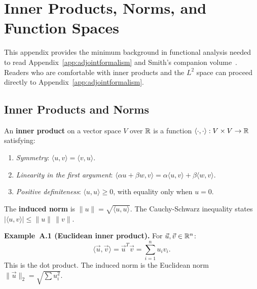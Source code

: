 
\chapter{Inner Products, Norms, and Function Spaces}
\label{app:innerproduct}

This appendix provides the minimum background in functional analysis
needed to read Appendix~\ref{app:adjointformalism} and Smith's companion
volume~\cite{smith2014uncertainty}. Readers who are comfortable with inner products
and the $L^2$ space can proceed directly to Appendix~\ref{app:adjointformalism}.

\section{Inner Products and Norms}
\label{appsec:innerproducts}

An \textbf{inner product} on a vector space $V$ over $\mathbb{R}$ is a function
$\langle \cdot, \cdot \rangle : V \times V \to \mathbb{R}$ satisfying:
\begin{enumerate}[nosep]
  \item \textit{Symmetry}: $\langle u, v \rangle = \langle v, u \rangle$.
  \item \textit{Linearity in the first argument}:
        $\langle \alpha u + \beta w, v \rangle
        = \alpha\langle u, v\rangle + \beta\langle w, v\rangle$.
  \item \textit{Positive definiteness}: $\langle u, u \rangle \geq 0$,
        with equality only when $u = 0$.
\end{enumerate}

The \textbf{induced norm} is $\|u\| = \sqrt{\langle u, u \rangle}$.
The Cauchy-Schwarz inequality states $|\langle u, v \rangle| \leq \|u\|\,\|v\|$.

\medskip

\noindent\textbf{Example~A.1 (Euclidean inner product).}
For $\vec{u}, \vec{v} \in \mathbb{R}^n$:
\[
  \langle \vec{u}, \vec{v} \rangle = \vec{u}^T\vec{v} = \sum_{i=1}^n u_i v_i.
\]
This is the dot product. The induced norm is the Euclidean norm
$\|\vec{u}\|_2 = \sqrt{\sum u_i^2}$.

